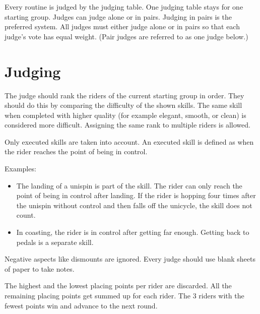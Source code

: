 Every routine is judged by the judging table.
One judging table stays for one starting group.
Judges can judge alone or in pairs.
Judging in pairs is the preferred system.
All judges must either judge alone or in pairs so that each judge's vote has equal weight.
(Pair judges are referred to as one judge below.)

\section{Judging}

The judge should rank the riders of the current starting group in order.
They should do this by comparing the difficulty of the shown skills.
The same skill when completed with higher quality (for example elegant, smooth, or clean) is considered more difficult.
Assigning the same rank to multiple riders is allowed.

Only executed skills are taken into account.
An executed skill is defined as when the rider reaches the point of being in control.

Examples:
\begin{itemize}
\item The landing of a unispin is part of the skill.
The rider can only reach the point of being in control after landing.
If the rider is hopping four times after the unispin without control and then falls off the unicycle, the skill does not count.
\item In coasting, the rider is in control after getting far enough.
Getting back to pedals is a separate skill.
\end{itemize}

Negative aspects like dismounts are ignored.
Every judge should use blank sheets of paper to take notes.

The highest and the lowest placing points per rider are discarded.
All the remaining placing points get summed up for each rider.
The 3 riders with the fewest points win and advance to the next round.
